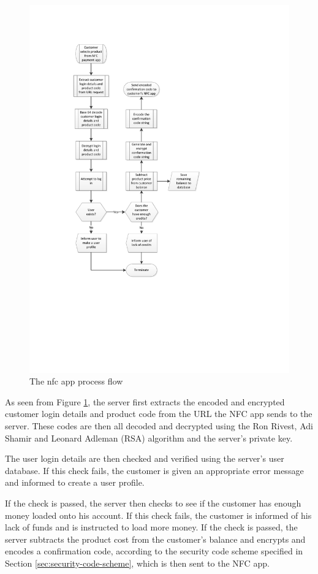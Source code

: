 \begin{figure}
 \centering 
 \includegraphics[clip=true, trim = 0 200 100 80,
 scale=0.7]{nfc_processflow_bak}
 \caption{The nfc app process flow}
 \label{fig:nfc-process}
\end{figure}

As seen from Figure \ref{fig:nfc-process}, the server first extracts the encoded and encrypted
customer login details and product code from the URL the NFC app sends to the server. These
codes are then all decoded and decrypted using the Ron Rivest, Adi Shamir and Leonard Adleman
(RSA) algorithm and the server's private key. 

The user login details are then checked and verified using the server's user database. If this
check fails, the customer is given an appropriate error message and informed to create a user
profile. 

If the check is passed, the server then checks to see if the customer has enough money loaded
onto his account. If this check fails, the customer is informed of his lack of funds
and is instructed to load more money. If the check is passed, the server subtracts the product
cost from the customer's balance and encrypts and encodes a confirmation code, according to the
security code scheme specified in Section \ref{sec:security-code-scheme}, which is then sent
to the NFC app. 

